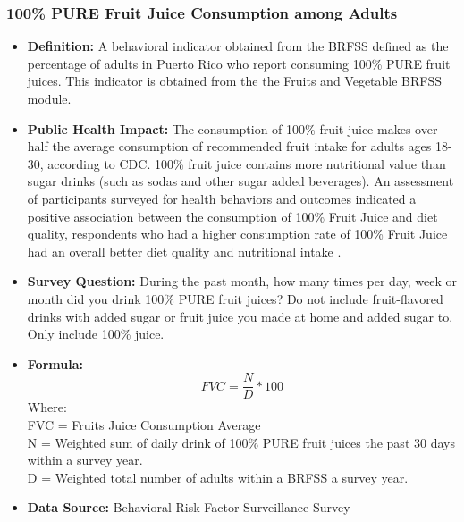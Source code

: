 \documentclass[12pt,letterpaper]{report}
\begin{document}
		\subsubsection{100\% PURE Fruit Juice Consumption among Adults} 
	\begin{itemize}
		\item \textbf{Definition:} A behavioral indicator obtained from the BRFSS defined as the percentage of adults in Puerto Rico who report consuming 100\% PURE fruit juices. This indicator is obtained from the the Fruits and Vegetable BRFSS module.

		\item \textbf{Public Health Impact:}  The consumption of 100\% fruit juice makes over half the average consumption of recommended fruit intake for adults ages 18-30, according to CDC. \cite{DietaryGuidelines2010} 100\% fruit juice contains more nutritional value than sugar drinks (such as sodas and other sugar added beverages). An assessment of participants surveyed for health behaviors and outcomes indicated a positive association between the consumption of 100\% Fruit Juice and diet quality, respondents who had a higher consumption rate of 100\% Fruit Juice had an overall better diet quality and nutritional intake \cite{o2011diet}.

		\item \textbf{Survey Question:} During the past month, how many times per day, week or month did you drink 100\% PURE fruit juices? Do not include fruit-flavored drinks with added sugar or fruit juice you made at home and added sugar to. Only include 100\% juice.
		\item \textbf{Formula:} 
			\begin{equation}
				FVC = \frac{N}{D} *100
			\end{equation}
Where: \\
			FVC = Fruits Juice Consumption Average\\
			
			N = Weighted sum of daily drink of 100\% PURE fruit juices the past 30 days within a survey year.\\
			
			D = Weighted total number of adults within a BRFSS a survey year.\\
			
		\item \textbf{Data Source:} Behavioral Risk Factor Surveillance Survey
	\end{itemize}

\end{document}
